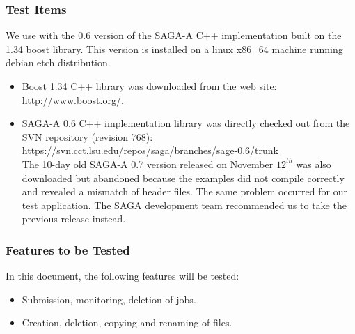 \subsubsection{Test Items}

We use with the 0.6 version of the SAGA-A C++
implementation built on the 1.34  boost library. This version is 
installed on a linux x86\_64 machine running debian etch distribution.
 
\begin{itemize}
 \item  Boost 1.34 C++ library was downloaded from the web site:\\
 	\mbox{\href{http://www.boost.org/}{http://www.boost.org/}}. 
 \item SAGA-A 0.6 C++ implementation library was directly checked out 
   from the SVN repository (revision 768):\\
	\mbox{\href{https://svn.cct.lsu.edu/repos/saga/branches/sage-0.6/trunk }
	{https://svn.cct.lsu.edu/repos/saga/branches/sage-0.6/trunk }}\\
   The 10-day old SAGA-A 0.7 version released on November $12^{th}$ was also downloaded
   but abandoned because the examples did not compile correctly and
       revealed a mismatch of header files. The same problem occurred for
       our test application. The SAGA development team recommended us to
       take the previous release instead.
\end{itemize}

\subsubsection{Features to be Tested}
In this document, the following features will be tested:
\begin{itemize}
 \item Submission, monitoring, deletion of jobs.
 \item Creation, deletion, copying and renaming of files.
\end{itemize}


